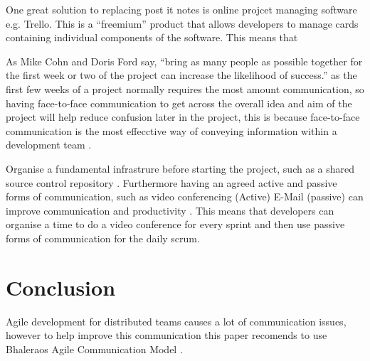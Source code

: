 \documentclass{scrartcl}
\begin{document}
One great solution to replacing post it notes is online projcet managing software e.g. Trello. This is a ``freemium'' product that allows developers to manage cards containing individual components of the software. This means that 


As Mike Cohn and Doris Ford say, ``bring as many people as possible together for the first week or two of the project can increase the likelihood of success.'' \cite{cohn2003} as the first few weeks of a project normally requires the most amount communication, so having face-to-face communication to get across the overall idea and aim of the project will help reduce confusion later in the project, this is because face-to-face communication is the most effecctive way of conveying information within a development team \cite{williams2012}.


Organise a fundamental infrastrure before starting the project, such as a shared source control repository \cite{dinakar2009}. Furthermore having an agreed active and passive forms of communication, such as video conferencing (Active) E-Mail (passive) can improve communication and productivity \cite{joshi2013}. This means that developers can organise a time to do a video conference for every sprint and then use passive forms of communication for the daily scrum.


\section{Conclusion}

Agile development for distributed teams causes a lot of communication issues, however to help improve this communication this paper recomends to use Bhaleraos Agile Communication Model \cite{bhalerao2010}. 




\end{document}
